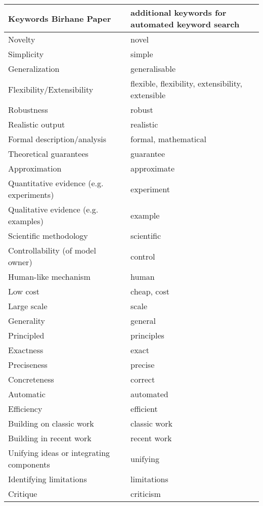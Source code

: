 \documentclass{article}
\begin{document}
\begin{table}[h]
    \centering
    \begin{tabular}{|l|l|}
        \hline
        \textbf{Keywords Birhane Paper} & \textbf{additional keywords for automated keyword search} \\
        \hline
        Novelty & novel \\
        Simplicity & simple \\
        Generalization & generalisable \\
        Flexibility/Extensibility & flexible, flexibility, extensibility, extensible \\
        Robustness & robust \\
        Realistic output & realistic \\
        Formal description/analysis & formal, mathematical \\
        Theoretical guarantees & guarantee \\
        Approximation & approximate \\
        Quantitative evidence (e.g. experiments) & experiment \\
        Qualitative evidence (e.g. examples) & example \\
        Scientific methodology & scientific \\
        Controllability (of model owner) & control \\
        Human-like mechanism & human \\
        Low cost & cheap, cost \\
        Large scale & scale \\
        Generality & general \\
        Principled & principles \\
        Exactness & exact \\
        Preciseness & precise \\
        Concreteness & correct \\
        Automatic & automated \\
        Efficiency & efficient \\
        Building on classic work & classic work \\
        Building in recent work & recent work \\
        Unifying ideas or integrating components & unifying \\
        Identifying limitations & limitations \\
        Critique & criticism \\

\end{tabular}
\end{table}
\end{document}
